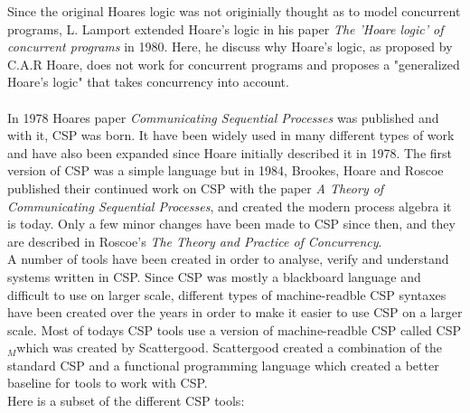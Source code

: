 \documentclass[a4paper]{report}
\newcommand{\cspm}{CSP$_M$}
\begin{document}
Since the original Hoares logic was not originially thought as to model concurrent programs, L. Lamport extended Hoare's logic in his paper \textit{The 'Hoare logic' of concurrent programs}\cite{Lamport1980} in 1980. Here, he discuss why Hoare's logic, as proposed by C.A.R Hoare, does not work for concurrent programs and proposes a "generalized Hoare's logic" that takes concurrency into account. \\\\
In 1978 Hoares paper \textit{Communicating Sequential Processes} was published and with it, CSP was born. It have been widely used in many different types of work and have also been expanded since Hoare initially described it in 1978\cite{Abdallah2005}. The first version of CSP was a simple language but in 1984, Brookes, Hoare and Roscoe published their continued work on CSP with the paper \textit{A Theory of Communicating Sequential Processes}\cite{Brookes1984}, and created the modern process algebra it is today. Only a few minor changes have been made to CSP since then, and they are described in Roscoe's \textit{The Theory and Practice of Concurrency}\cite{Roscoe1997}.\\
A number of tools have been created in order to analyse, verify and understand systems written in CSP. Since CSP was mostly a blackboard language and difficult to use on larger scale, different types of machine-readble CSP syntaxes have been created over the years in order to make it easier to use CSP on a larger scale. Most of todays CSP tools use a version of machine-readble CSP called \cspm which was created by Scattergood\cite{Scattergood1998}. Scattergood created a combination of the standard CSP and a functional programming language which created a better baseline for tools to work with CSP.\\ 
Here is a subset of the different CSP tools:
\end{document}
